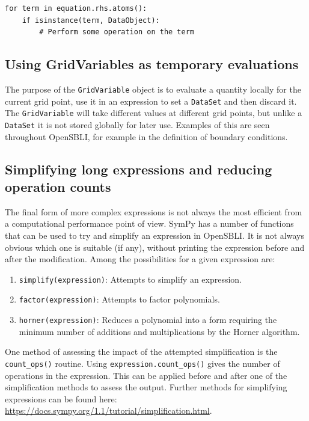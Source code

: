 \documentclass[11pt]{article}
\begin{document}
\begin{lstlisting}
for term in equation.rhs.atoms():
    if isinstance(term, DataObject):
        # Perform some operation on the term
\end{lstlisting}

\subsection{Using GridVariables as temporary evaluations}
The purpose of the \verb|GridVariable| object is to evaluate a quantity locally for the current grid point, use it in an expression to set a \verb|DataSet| and then discard it. The \verb|GridVariable| will take different values at different grid points, but unlike a \verb|DataSet| it is not stored globally for later use. Examples of this are seen throughout OpenSBLI, for example in the definition of boundary conditions.

\subsection{Simplifying long expressions and reducing operation counts}
The final form of more complex expressions is not always the most efficient from a computational performance point of view. SymPy has a number of functions that can be used to try and simplify an expression in OpenSBLI. It is not always obvious which one is suitable (if any), without printing the expression before and after the modification. Among the possibilities for a given expression are:
\begin{enumerate}
\item{\verb|simplify(expression)|: Attempts to simplify an expression.}
\item{\verb|factor(expression)|: Attempts to factor polynomials.}
\item{\verb|horner(expression)|: Reduces a polynomial into a form requiring the minimum number of additions and multiplications by the Horner algorithm.}
\end{enumerate}

One method of assessing the impact of the attempted simplification is the \verb|count_ops()| routine. Using \verb|expression.count_ops()| gives the number of operations in the expression. This can be applied before and after one of the simplification methods to assess the output. Further methods for simplifying expressions can be found here: \url{https://docs.sympy.org/1.1/tutorial/simplification.html}.

\newpage
\end{document}
